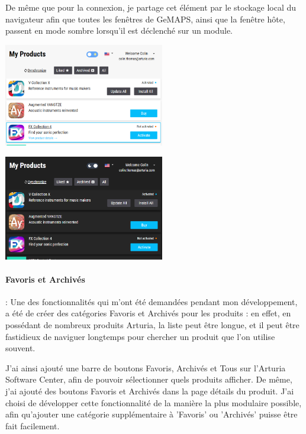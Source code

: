 \documentclass[francais]{rapportPFE}  %
\begin{document}
De même que pour la connexion, je partage cet élément par le stockage local du navigateur afin que toutes les fenêtres de GeMAPS, ainsi que la fenêtre hôte, passent en mode sombre lorsqu'il est déclenché sur un module.

\begin{center}
    \centering
    \begin{minipage}{.5\textwidth}
    \centering
    \includegraphics[width=7cm]{graphics/daymode.png}
    \label{fig:test1}
    \end{minipage}%
    \begin{minipage}{.5\textwidth}
    \centering
    \includegraphics[width=7cm]{graphics/darkmode.png}
    \label{fig:test2}
    \end{minipage}
    \end{center}


\paragraph{Favoris et Archivés}: 
Une des fonctionnalités qui m'ont été demandées pendant mon développement, a été de créer des catégories Favoris et Archivés pour les produits : en effet, en possédant de nombreux produits Arturia, la liste peut être longue, et il peut être fastidieux de naviguer longtemps pour chercher un produit que l'on utilise souvent.

J'ai ainsi ajouté une barre de boutons Favoris, Archivés et Tous sur l'Arturia Software Center, afin de pouvoir sélectionner quels produits afficher.
De même, j'ai ajouté des boutons Favoris et Archivés dans la page détails du produit. 
J'ai choisi de développer cette fonctionnalité de la manière la plus modulaire possible, afin qu'ajouter une catégorie supplémentaire à 'Favoris' ou 'Archivés' puisse être fait facilement. 
\end{document}
